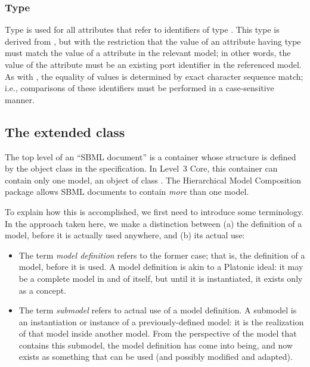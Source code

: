 \subsubsection{Type \fixttspace{}}
\label{primtype-portidref}

Type  is used for all attributes that refer to identifiers of type .  This type is derived from , but with the restriction that the value of an attribute having type  must match the value of a  attribute in the relevant model;  in other words, the value of the attribute must be an existing port identifier in the referenced model.  As with , the equality of  values is determined by exact character sequence match; i.e., comparisons of these identifiers must be performed in a case-sensitive manner.


\subsection{The extended  class}
\label{sbml-class}
\label{listofmodeldefinitions-class}
\label{listofexternalmodeldefinitions-class}

The top level of an ``SBML document'' is a container whose structure is defined by the object class \SBML in the \sbmlthreecore specification.  In Level~3 Core, this container can contain only one model, an object of class \Model.  The Hierarchical Model Composition package allows SBML documents to contain \emph{more} than one model.

To explain how this is accomplished, we first need to introduce some terminology.  In the approach taken here, we make a distinction between (a) the definition of a model, before it is actually used anywhere, and (b) its actual use:

\begin{itemize}

\item The term \emph{model definition} refers to the former case; that is, the definition of a model, before it is used.  A model definition   is akin to a Platonic ideal: it may be a complete model in and of   itself, but until it is instantiated, it exists only as a concept.

\item The term \emph{submodel} refers to actual use of a model   definition.  A submodel is an instantiation or instance of a   previously-defined model: it is the realization of that model inside   another model.  From the perspective of the model that contains this   submodel, the model definition has come into being, and now exists as   something that can be used (and possibly modified and adapted).

\end{itemize}


